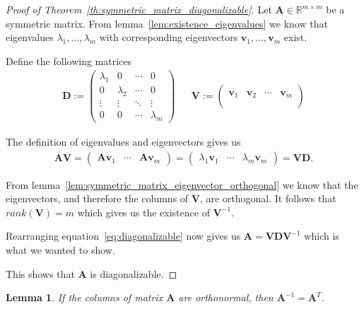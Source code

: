 \documentclass[a4paper]{IEEEtran}
\newtheorem{lemma}{Lemma}
\begin{document}
\begin{proof}[Proof of Theorem~\ref{th:symmetric_matrix_diagonalizable}]
	Let $\mathbf{A} \in \mathbb{R}^{m\times m}$ be a symmetric matrix. From lemma~\ref{lem:existence_eigenvalues} we know that eigenvalues $\lambda_1, ..., \lambda_m$ with corresponding eigenvectors $\mathbf{v}_1, ..., \mathbf{v}_m$ exist.
	
	Define the following matrices
	\begin{align*}
		\mathbf{D} := \left(\begin{matrix}
			\lambda_1 & 0 & \cdots & 0\\
			0 & \lambda_2 & \cdots & 0\\
			\vdots & \vdots & \ddots & \vdots\\
			0 & 0 & \cdots & \lambda_m
		\end{matrix}\right) &&
		\mathbf{V} := \left(\begin{matrix}
			 & & &\\
			\mathbf{v}_1 & \mathbf{v}_2 & \cdots & \mathbf{v}_m\\
			 & & &\\
		\end{matrix}\right)
	\end{align*}
	
	The definition of eigenvalues and eigenvectors gives us
	\begin{align}
		\label{eq:diagonalizable}
		\mathbf{AV} = \left(\begin{matrix}
			\mathbf{Av}_1 & \cdots & \mathbf{Av}_m
		\end{matrix}\right) = \left(\begin{matrix}
			\lambda_1\mathbf{v}_1 & \cdots & \lambda_m\mathbf{v}_m
		\end{matrix}\right) = \mathbf{VD}.
	\end{align}
	
	From lemma~\ref{lem:symmetric_matrix_eigenvector_orthogonal} we know that the eigenvectors, and therefore the columns of $\mathbf{V}$, are orthogonal. It follows that $rank(\mathbf{V}) = m$ which gives us the existence of $\mathbf{V}^{-1}$.
	
	Rearranging equation~\ref{eq:diagonalizable} now gives us $\mathbf{A} = \mathbf{VDV}^{-1}$ which is what we wanted to show.
	
	This shows that $\mathbf{A}$ is diagonalizable.
\end{proof}

\begin{lemma}
	\label{lem:inverse_is_transpose}
	If the columns of matrix $\mathbf{A}$ are orthonormal, then $\mathbf{A}^{-1} = \mathbf{A}^T$.
\end{lemma}
\end{document}
